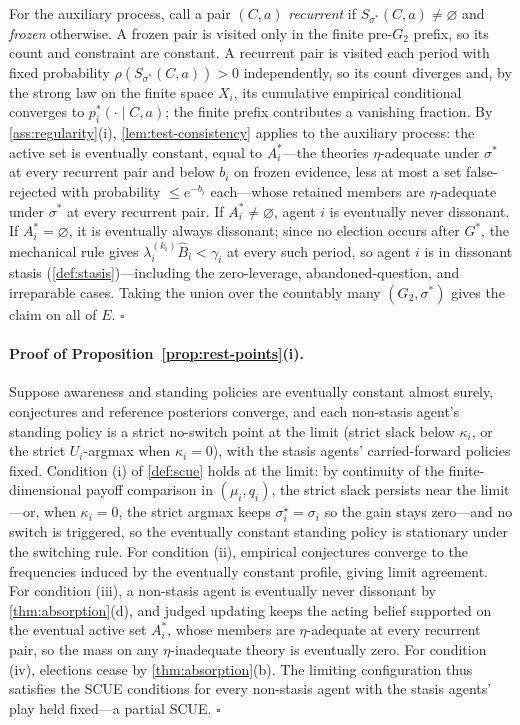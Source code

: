 \documentclass[11pt]{article}
\theoremstyle{definition}
\newcommand{\emptysetset}{\varnothing}
\begin{document}
For the auxiliary process, call a pair $(C,a)$ \emph{recurrent} if $S_{\sigma^{*}}(C,a)\neq\emptysetset$ and \emph{frozen} otherwise.
A frozen pair is visited only in the finite pre-$G_2$ prefix, so its count and constraint are constant.
A recurrent pair is visited each period with fixed probability $\rho(S_{\sigma^{*}}(C,a))>0$ independently, so its count diverges and, by the strong law on the finite space $X_i$, its cumulative empirical conditional converges to $p_i^{*}(\cdot\mid C,a)$; the finite prefix contributes a vanishing fraction.
By \cref{ass:regularity}(i), \cref{lem:test-consistency} applies to the auxiliary process: the active set is eventually constant, equal to $A_i^{*}$---the theories $\eta$-adequate under $\sigma^{*}$ at every recurrent pair and below $b_i$ on frozen evidence, less at most a set false-rejected with probability $\le e^{-b_i}$ each---whose retained members are $\eta$-adequate under $\sigma^{*}$ at every recurrent pair.
If $A_i^{*}\neq\emptysetset$, agent $i$ is eventually never dissonant.
If $A_i^{*}=\emptysetset$, it is eventually always dissonant; since no election occurs after $G^{*}$, the mechanical rule gives $\lambda_i^{(k_i)}\widehat B_i<\gamma_i$ at every such period, so agent $i$ is in dissonant stasis (\cref{def:stasis})---including the zero-leverage, abandoned-question, and irreparable cases.
Taking the union over the countably many $(G_2,\sigma^{*})$ gives the claim on all of $E$.
\hfill$\square$

\paragraph{Proof of Proposition~\ref{prop:rest-points}(i).}
Suppose awareness and standing policies are eventually constant almost surely, conjectures and reference posteriors converge, and each non-stasis agent's standing policy is a strict no-switch point at the limit (strict slack below $\kappa_i$, or the strict $U_i$-argmax when $\kappa_i=0$), with the stasis agents' carried-forward policies fixed.
Condition (i) of \cref{def:scue} holds at the limit: by continuity of the finite-dimensional payoff comparison in $(\mu_i,q_i)$, the strict slack persists near the limit---or, when $\kappa_i=0$, the strict argmax keeps $\sigma_i^{\star}=\sigma_i$ so the gain stays zero---and no switch is triggered, so the eventually constant standing policy is stationary under the switching rule.
For condition (ii), empirical conjectures converge to the frequencies induced by the eventually constant profile, giving limit agreement.
For condition (iii), a non-stasis agent is eventually never dissonant by \cref{thm:absorption}(d), and judged updating keeps the acting belief supported on the eventual active set $A_i^{*}$, whose members are $\eta$-adequate at every recurrent pair, so the mass on any $\eta$-inadequate theory is eventually zero.
For condition (iv), elections cease by \cref{thm:absorption}(b).
The limiting configuration thus satisfies the SCUE conditions for every non-stasis agent with the stasis agents' play held fixed---a partial SCUE.
\hfill$\square$
\end{document}
